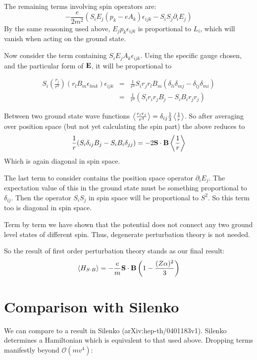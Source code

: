 The remaining terms involving spin operators are:
\[	 -\frac{e}{2m^2} ( S_i E_j (p_k - eA_k) \epsilon_{ijk} - S_i S_j \partial_i E_j) \]
By the same reasoning used above, $E_j p_k \epsilon_{ijk}$ is proportional to $L_i$, which will vanish when acting on the ground state.

Now consider the term containing $S_i E_j A_k \epsilon_{ijk}$.  Using the specific gauge chosen, and the particular form of $\mathbf{E}$, it will be proportional to 

\begin{eqnarray*}
S_i \left( \frac{r_j}{r^3} \right) (r_l B_m \epsilon_{lmk}) \epsilon_{ijk}
	&=&	\frac{1}{r^3} S_i r_j r_l B_m (\delta_{li} \delta_{mj} - \delta_{lj} \delta_{mi} )	\\
	&=&	\frac{1}{r^3} (S_i r_i r_j B_j - S_i B_i r_j r_j)
\end{eqnarray*}	

Between two ground state wave functions $\left< \frac{r_i r_j}{r^3} \right>=\delta_{ij}\frac{1}{3}\left< \frac{1}{r} \right>$.  So after averaging over position space (but not yet calculating the spin part) the above reduces to
\[	 
	\frac{1}{r} (S_i \delta_{ij} B_j - S_i B_i \delta_{jj})
	= -2 \mathbf{S} \cdot \mathbf{B} \left< \frac{1}{r} \right>
\]
Which is again diagonal in spin space.

The last term to consider contains the position space operator $\partial_i E_j$.  The expectation value of this in the ground state must be something proportional to $\delta_{ij}$.  Then the operator $S_i S_j$ in spin space will be proportional to $S^2$.  So this term too is diagonal in spin space.

Term by term we have shown that the potential does not connect any two ground level states of different spin.  Thus, degenerate perturbation theory is not needed.

So the result of first order perturbation theory stands as our final result:
\[ \left< H_{S \cdot B}  \right>
	=  - \frac{e}{m} \mathbf{S} \cdot \mathbf{B} \left (1 - \frac{(Z\alpha)^2}{3} \right )			 
\]

\appendix


\section{Comparison with Silenko}

We can compare to a result in Silenko (arXiv:hep-th/0401183v1).  Silenko determines a Hamiltonian which is equivalent to that used above.  Dropping terms manifestly beyond $\mathcal{O}(mv^4)$:

